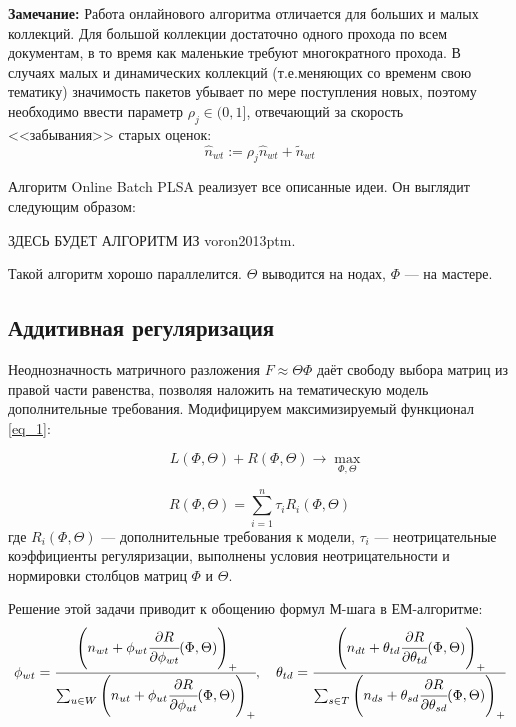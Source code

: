 {\bf Замечание:} Работа онлайнового алгоритма отличается для больших и малых коллекций. Для большой коллекции достаточно одного прохода по всем документам, в то время как маленькие требуют многократного прохода. В случаях малых и динамических коллекций (т.е.меняющих со временм свою тематику) значимость пакетов убывает по мере поступления новых, поэтому необходимо ввести параметр $\rho_j \in (0,1]$, отвечающий за скорость <<забывания>> старых оценок: 
\[
	\hat n_{wt} := \rho_j \hat n_{wt} + \tilde n_{wt}
\] 

Алгоритм Online Batch PLSA реализует все описанные идеи. Он выглядит следующим образом:

ЗДЕСЬ БУДЕТ АЛГОРИТМ ИЗ voron2013ptm.

Такой алгоритм хорошо параллелится. $\Theta$ выводится на нодах, $\Phi$ --- на мастере.

\subsection{Аддитивная регуляризация}

Неоднозначность матричного разложения $F \approx \Theta \Phi$ даёт свободу выбора матриц из правой части равенства, позволяя наложить на тематическую модель дополнительные требования.  
Модифицируем максимизируемый функционал \ref{eq_1}:

\begin{equation}
	\quad L(\Phi,\Theta) + R(\Phi,\Theta) \rightarrow \max_{\Phi,\Theta}
\end{equation}	

\[
 	R(\Phi,\Theta) = \sum_{i = 1}^{n} \tau_i R_i(\Phi,\Theta)
\]	
где $R_i(\Phi,\Theta)$ --- дополнительные требования к модели, $\tau_i$ --- неотрицательные  коэффициенты регуляризации, выполнены условия неотрицательности и нормировки столбцов матриц $\Phi$ и $\Theta$.
 	 
Решение этой задачи приводит к обощению формул М-шага в ЕМ-алгоритме:
\begin{equation}
	\phi_{wt} = \cfrac{\left(n_{wt} + \phi_{wt} \cfrac{\partial R}{\partial \phi_{wt}} (\Phi,\Theta) \right)_+}{\sum_{u \in W} \left(n_{ut} + \phi_{ut} \cfrac{\partial R}{\partial \phi_{ut}} (\Phi,\Theta) \right)_+}, \quad 
 	\theta_{td} = \cfrac{\left(n_{dt} + \theta_{td} \cfrac{\partial R}{\partial \theta_{td}} (\Phi,\Theta) \right)_+}{\sum_{s \in T} \left(n_{ds} + \theta_{sd} \cfrac{\partial R}{\partial \theta_{sd}} (\Phi,\Theta) \right)_+}
\end{equation} 
 	 
